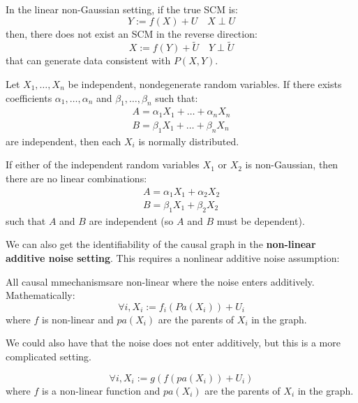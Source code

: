 \begin{definition}
    In the linear non-Gaussian setting, if the true SCM is:
    \begin{equation*}
        Y := f(X) + U \quad X \perp U
    \end{equation*}
    then, there does not exist an SCM in the reverse direction:
    \begin{equation*}
        X := f(Y) + \tilde{U} \quad Y \perp \tilde{U}
    \end{equation*}
    that can generate data consistent with $P(X, Y)$.
\end{definition}

\begin{theorem}
    Let $X_1, \dots, X_n$ be independent, nondegenerate random variables. If there
    exists coefficients $\alpha_1, \dots, \alpha_n$ and $\beta_1, \dots, \beta_n$ such that:
    \begin{equation*}
        \begin{split}
            A = \alpha_1X_1 + \dots + \alpha_nX_n \\
            B = \beta_1X_1 + \dots + \beta_nX_n
        \end{split}
    \end{equation*}
    are independent, then each $X_i$ is normally distributed.
\end{theorem}
\begin{corollary}
    If either of the independent random variables $X_1$ or $X_2$ is non-Gaussian,
    then there are no linear combinations:
    \begin{equation}
        \begin{split}
            A = \alpha_1X_1 + \alpha_2X_2 \\
            B = \beta_1X_1 + \beta_2X_2
        \end{split}
    \end{equation}
    such that $A$ and $B$ are independent (so $A$ and $B$ must be dependent).
\end{corollary}
We can also get the identifiability of the causal graph in the \textbf{non-linear additive
    noise setting}. This requires a nonlinear additive noise assumption:
\begin{definition}
    All causal mmechanismsare non-linear where the noise enters additively.
    Mathematically:
    \begin{equation}
        \forall i, X_i := f_i(Pa(X_i)) + U_i
    \end{equation}
    where $f$ is non-linear and $pa(X_i)$ are the parents of $X_i$ in the graph.
\end{definition}
We could also have that the noise does not enter additively, but this is a more
complicated setting.
\begin{definition}
    \begin{equation}
        \forall i, X_i := g(f(pa(X_i)) + U_i)
    \end{equation}
    where $f$ is a non-linear function and $pa(X_i)$ are the parents of $X_i$ in
    the graph.
\end{definition}
